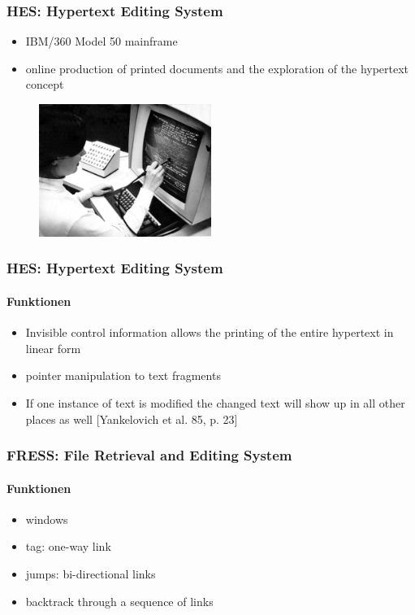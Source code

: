 \begin{frame}
\frametitle{HES: Hypertext Editing System}
\begin{itemize}
	\item IBM/360 Model 50 mainframe
	\item online production of printed documents and the exploration of the hypertext concept
\end{itemize}

\begin{figure}[htbp]
	\centering
	\includegraphics[width=0.50\textwidth]{images/hes}
\end{figure}

\end{frame}

\begin{frame}
\frametitle{HES: Hypertext Editing System}
\framesubtitle{Funktionen}
\begin{itemize}

	\item Invisible control information allows the printing of the entire hypertext in linear form
	\item pointer manipulation to text fragments
	\item If one instance of text is modified the changed text will show up in all other places as well [Yankelovich et al. 85, p. 23]
	

\end{itemize}
\end{frame}

\begin{frame}
\frametitle{FRESS: File Retrieval and Editing System}
\framesubtitle{Funktionen}

	\begin{itemize}
		\item windows
		\item tag: one-way link
		\item jumps: bi-directional links
		\item backtrack through a sequence of links
	\end{itemize}

\end{frame}
